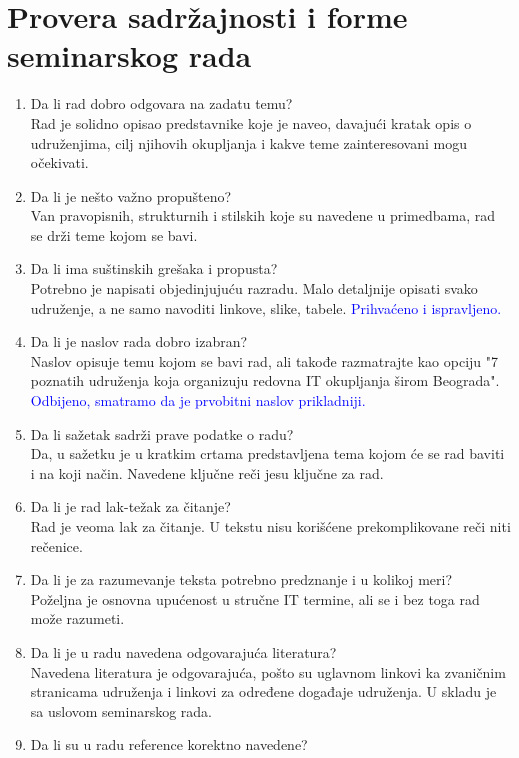 \documentclass[a4paper]{report}
\newcommand{\odgovor}[1]{\textcolor{blue}{#1}}
\begin{document}
\section{Provera sadržajnosti i forme seminarskog rada}

\begin{enumerate}
\item Da li rad dobro odgovara na zadatu temu?\\
Rad je solidno opisao predstavnike koje je naveo, davajući kratak opis o udruženjima,
cilj njihovih okupljanja i kakve teme zainteresovani mogu očekivati. 
\item Da li je nešto važno propušteno?\\
Van pravopisnih, strukturnih i stilskih koje su navedene u primedbama, 
rad se drži teme kojom se bavi.
\item Da li ima suštinskih grešaka i propusta?\\
Potrebno je napisati objedinjujuću razradu. Malo detaljnije opisati 
svako udruženje, a ne samo navoditi linkove, slike, tabele.
\odgovor{Prihvaćeno i ispravljeno.}
\item Da li je naslov rada dobro izabran?\\
Naslov opisuje temu kojom se bavi rad, ali takođe razmatrajte kao 
opciju "7 poznatih udruženja koja organizuju redovna IT
okupljanja širom Beograda".
\odgovor{Odbijeno, smatramo da je prvobitni naslov prikladniji.}
\item Da li sažetak sadrži prave podatke o radu?\\
Da, u sažetku je u kratkim crtama predstavljena tema kojom će se
rad baviti i na koji način. Navedene ključne reči jesu ključne za rad.
\item Da li je rad lak-težak za čitanje?\\
Rad je veoma lak za čitanje. U tekstu nisu korišćene prekomplikovane reči niti rečenice.
\item Da li je za razumevanje teksta potrebno predznanje i u kolikoj meri?\\
Poželjna je osnovna upućenost u stručne IT termine, ali se i bez toga rad može razumeti.
\item Da li je u radu navedena odgovarajuća literatura?\\
Navedena literatura je odgovarajuća, pošto su uglavnom linkovi ka zvaničnim stranicama
udruženja i linkovi za određene događaje udruženja. U skladu je sa uslovom seminarskog rada. 
\item Da li su u radu reference korektno navedene?\\

\end{enumerate}
\end{document}
